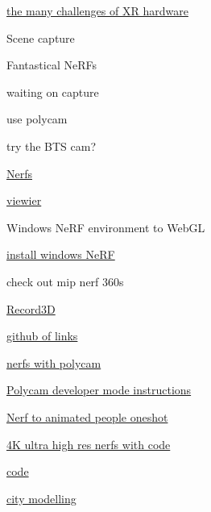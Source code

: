       \href{https://www.matthewball.vc/all/why-vrar-gets-farther-away-as-it-comes-into-focus}{the
      many challenges of XR hardware}
     
   
 
  Scene capture

   
  \tightlist
   
    Fantastical NeRFs

     
    \tightlist
     
      waiting on capture

       
      \tightlist
       
        use polycam
       
        try the BTS cam?
       
     
      \href{https://www.matthewtancik.com/nerf}{Nerfs}
     
      \href{https://github.com/sxyu/volrend}{viewier}
     
      Windows NeRF environment to WebGL

       
      \tightlist
       
        \href{https://github.com/bycloudai/instant-ngp-Windows}{install
        windows NeRF}
       
     
      check out mip nerf 360s
     
      \href{https://github.com/marek-simonik/record3d_unity_streaming}{Record3D}
     
      \href{https://github.com/yenchenlin/awesome-NeRF}{github of links}
     
      \href{https://www.linkedin.com/posts/robcsloan_nerfstudio-nerfstudio-polycam-activity-6999169160379297792-SN4F?utm_source=share\&utm_medium=member_desktop}{nerfs
      with polycam}

       
      \tightlist
       
        \href{https://docs.nerf.studio/en/latest/quickstart/custom_dataset.html\#polycam-capture}{Polycam
        developer mode instructions}
       
     
      \href{https://elicit3d.github.io/}{Nerf to animated people
      oneshot}
     
      \href{https://paperswithcode.com/paper/4k-nerf-high-fidelity-neural-radiance-fields}{4K
      ultra high res nerfs with code}

       
      \tightlist
       
        \href{https://github.com/frozoul/4K-NeRF}{code}
       
     
      \href{https://www.reddit.com/r/deeplearning/comments/zowgqn/neural_rendering_reconstruct_your_city_in_3d/}{city
      modelling}
     
